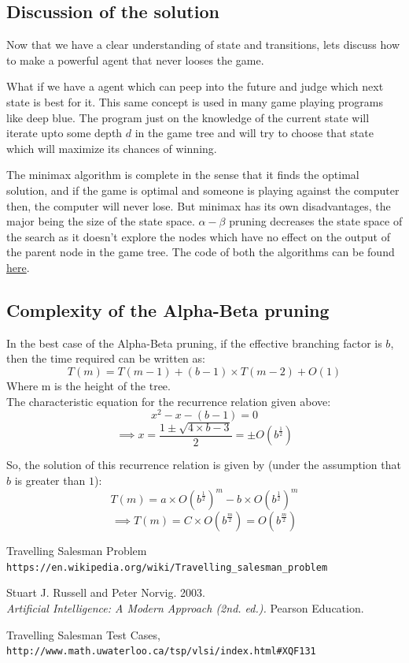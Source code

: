 \documentclass[journal, compsoc]{IEEEtran}
\begin{document}
\subsection{Discussion of the solution}
Now that we have a clear understanding of state and transitions, lets discuss how to make a powerful agent that never looses the game. 

What if we have a agent which can peep into the future and judge which next state is best for it. This same concept is used in many game
playing programs like deep blue. The program just on the knowledge of the current state will iterate upto some depth $d$ in the game tree
and will try to choose that state which will maximize its chances of winning.

The minimax algorithm is complete in the sense that it finds the optimal solution, and if the game is optimal and someone is playing against the computer then, the computer
will never lose. But minimax has its own disadvantages, the major being the size of the state space. $\alpha-\beta$ pruning decreases the state space of the search as it
doesn't explore the nodes which have no effect on the output of the parent node in the game tree. The code of both the algorithms can be found \href{https://github.com/sid-tiw/AI-codes/blob/main/codes/min\_max\_improved.cpp}{here}.

\subsection {Complexity of the Alpha-Beta pruning}

In the best case of the Alpha-Beta pruning, if the effective branching factor is $b$, then the time required can be written as:
\[T(m) = T(m - 1) + (b - 1) \times T(m - 2) + O(1)\]
Where m is the height of the tree.\\
The characteristic equation for the recurrence relation given above:
\[x^2 - x - (b - 1) = 0\]
\[\implies x = \frac{1 \pm \sqrt{4 \times b - 3}}{2} = \pm O(b^{\frac{1}{2}})\]

So, the solution of this recurrence relation is given by (under the assumption that $b$ is greater than $1$):
\[T(m) = a \times O(b^{\frac{1}{2}})^{m} - b \times O(b^{\frac{1}{2}})^{m}\]
\[\implies T(m) = C \times O(b^{\frac{m}{2}}) = O(b^{\frac{m}{2}})\]


\begin{thebibliography}{9}
Travelling Salesman Problem
\\\texttt{https://en.wikipedia.org/wiki/Travelling\_salesman\_problem}

Stuart J. Russell and Peter Norvig. 2003.
\\\textit{Artificial Intelligence: A Modern Approach (2nd. ed.).}
Pearson Education.

Travelling Salesman Test Cases,
\\\texttt{http://www.math.uwaterloo.ca/tsp/vlsi/index.html\#XQF131}
\end{thebibliography}
\end{document}
